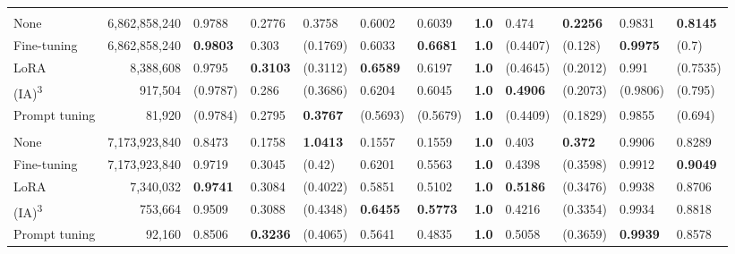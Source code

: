 \begin{table*}[htbp]
\begin{threeparttable}
\begin{tabularx}{\textwidth}{lrLLLLL!{\color{white}\ }LLLLL}
         \bigstrut \\*
        None & 6,862,858,240 & 0.9788 & 0.2776 & 0.3758 & 0.6002 & 0.6039 & \textbf{1.0} & 0.474 & \textbf{0.2256} & 0.9831 & \textbf{0.8145} \\
        Fine-tuning & 6,862,858,240 & \textbf{0.9803} & 0.303 & (0.1769) & 0.6033 & \textbf{0.6681} & \textbf{1.0} & (0.4407) & (0.128) & \textbf{0.9975} & (0.7) \\
        LoRA & 8,388,608 & 0.9795 & \textbf{0.3103} & (0.3112) & \textbf{0.6589} & 0.6197 & \textbf{1.0} & (0.4645) & (0.2012) & 0.991 & (0.7535) \\
        (IA)\textsuperscript{3} & 917,504 & (0.9787) & 0.286 & (0.3686) & 0.6204 & 0.6045 & \textbf{1.0} & \textbf{0.4906} & (0.2073) & (0.9806) & (0.795) \\
        Prompt tuning & 81,920 & (0.9784) & 0.2795 & \textbf{0.3767} & (0.5693) & (0.5679) & \textbf{1.0} & (0.4409) & (0.1829) & 0.9855 & (0.694) \\

         \bigstrut \\*
        None & 7,173,923,840 & 0.8473 & 0.1758 & \textbf{1.0413} & 0.1557 & 0.1559 & \textbf{1.0} & 0.403 & \textbf{0.372} & 0.9906 & 0.8289 \\
        Fine-tuning & 7,173,923,840 & 0.9719 & 0.3045 & (0.42) & 0.6201 & 0.5563 & \textbf{1.0} & 0.4398 & (0.3598) & 0.9912 & \textbf{0.9049} \\
        LoRA & 7,340,032 & \textbf{0.9741} & 0.3084 & (0.4022) & 0.5851 & 0.5102 & \textbf{1.0} & \textbf{0.5186} & (0.3476) & 0.9938 & 0.8706 \\
        (IA)\textsuperscript{3} & 753,664 & 0.9509 & 0.3088 & (0.4348) & \textbf{0.6455} & \textbf{0.5773} & \textbf{1.0} & 0.4216 & (0.3354) & 0.9934 & 0.8818 \\
        Prompt tuning & 92,160 & 0.8506 & \textbf{0.3236} & (0.4065) & 0.5641 & 0.4835 & \textbf{1.0} & 0.5058 & (0.3659) & \textbf{0.9939} & 0.8578 \\


\end{tabularx}
\end{threeparttable}
\end{table*}
